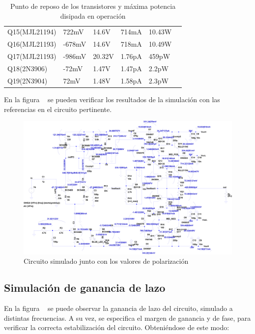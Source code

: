 \begin{table}[H]
\begin{center}
\begin{tabular}{llllll}
            Q15(MJL21194)   & 722mV     & 14.6V     & 714mA     & 10.43W    \\
            Q16(MJL21193)   &-678mV     & 14.6V     & 718mA     & 10.49W    \\
            Q17(MJL21193)   &-986mV     & 20.32V    & 1.76pA    & 459pW     \\
            Q18(2N3906)     &-72mV      & 1.47V     & 1.47pA    & 2.2pW     \\
            Q19(2N3904)     &72mV       & 1.48V     &1.58pA     & 2.3pW     \\\hline\hline
        \end{tabular}
    \caption{Punto de reposo de los transistores y máxima potencia disipada en operación}
    \label{tab:PuntoQ_simulacion}
    \end{center}
\end{table}

\par En la figura ~ se pueden verificar los resultados de la simulación con las referencias en el circuito pertinente.

\begin{figure}[H]
    \centering
    \includegraphics[scale=0.65]{./img/circuito/amplifier.png}
    \caption{Circuito simulado junto con los valores de polarización}
    \label{fig:PuntoQ_simulacion}
\end{figure}


\subsection{Simulación de ganancia de lazo}

\par En la figura ~ se puede observar la ganancia de lazo del circuito, simulado a distintas frecuencias. A su vez, se especifica el margen de ganancia y de fase, para verificar la correcta estabilización del circuito. Obteniéndose de este modo:

